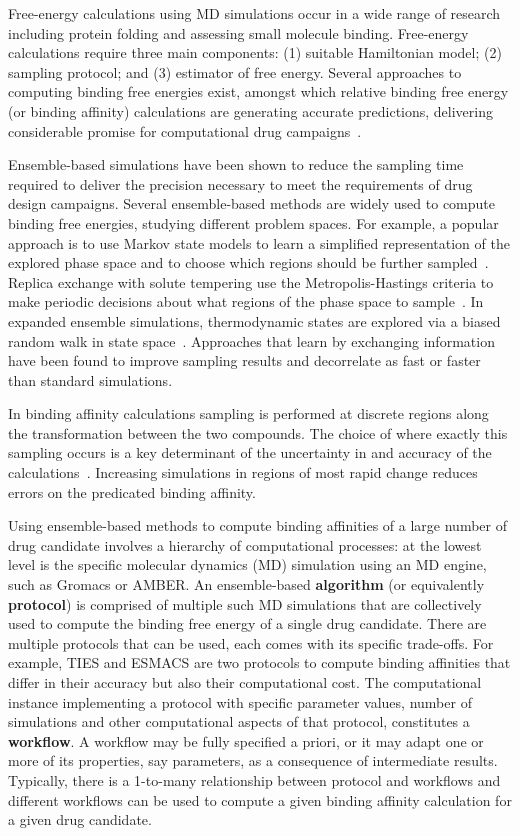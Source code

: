 Free-energy calculations using MD simulations occur in a wide range of
research including protein folding and assessing small molecule binding.
Free-energy calculations require three main components: (1) suitable
Hamiltonian model; (2) sampling protocol; and (3) estimator of free energy.
Several approaches to computing binding free energies exist, amongst which
relative binding free energy (or binding affinity) calculations are
generating accurate predictions, delivering considerable promise for
computational drug campaigns~\cite{Karplus2005}.

Ensemble-based simulations have been shown to reduce the sampling time
required to deliver the precision necessary to meet the requirements of drug
design campaigns. Several ensemble-based methods are widely used to compute
binding free energies, studying different problem spaces. For example, a
popular approach is to use Markov state models to learn a simplified
representation of the explored phase space and to choose which regions should
be further sampled~\cite{Bowman2010}. Replica exchange with solute tempering
use the Metropolis-Hastings criteria to make periodic decisions about what
regions of the phase space to sample~\cite{Earl2005,Hritz2008,Kim2012}. In
expanded ensemble simulations, thermodynamic states are explored via a biased
random walk in state space~\cite{Lyubartsev1992}. Approaches that learn by
exchanging information have been found to improve sampling results and
decorrelate as fast or faster than standard simulations.

In binding affinity calculations sampling is performed at discrete regions
along the transformation between the two compounds. The choice of where
exactly this sampling occurs is a key determinant of the uncertainty in and
accuracy of the calculations~\cite{Ruiter2013,Ruiter2016}. Increasing
simulations in regions of most rapid change reduces errors on the predicated
binding affinity.

Using ensemble-based methods to compute binding affinities of a large number
of drug candidate involves a hierarchy of computational processes: at the
lowest level is the specific molecular dynamics (MD) simulation using an MD
engine, such as Gromacs or AMBER. An ensemble-based \textbf{algorithm} (or
equivalently \textbf{protocol}) is comprised of multiple such MD simulations
that are collectively used to compute the binding free energy of a single drug
candidate. There are multiple protocols that can be used, each comes with its
specific trade-offs. For example, TIES and ESMACS are two protocols to compute
binding affinities that differ in their accuracy but also their computational
cost. The computational instance implementing a protocol with specific
parameter values, number of simulations and other computational aspects of
that protocol, constitutes a \textbf{workflow}. A workflow may be fully
specified a priori, or it may adapt one or more of its properties, say parameters,
as a consequence of intermediate results. Typically, there is a 1-to-many
relationship between protocol and workflows and different workflows can be
used to compute a given binding affinity calculation for a given drug
candidate.

